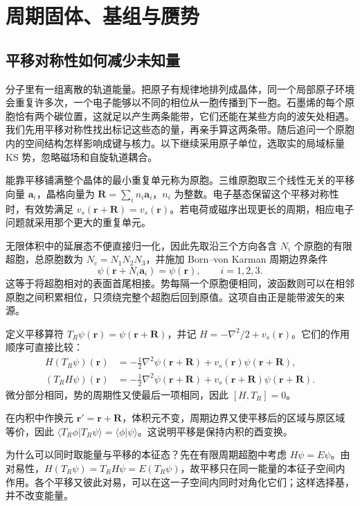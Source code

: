\chapter{周期固体、基组与赝势}
\section{平移对称性如何减少未知量}
分子里有一组离散的轨道能量。把原子有规律地排列成晶体，同一个局部原子环境会重复许多次，一个电子能够以不同的相位从一胞传播到下一胞。石墨烯的每个原胞恰有两个碳位置，这就足以产生两条能带，它们还能在某些方向的波矢处相遇。我们先用平移对称性找出标记这些态的量，再亲手算这两条带。随后追问一个原胞内的空间结构怎样影响成键与核力。以下继续采用原子单位，选取实的局域标量 KS 势，忽略磁场和自旋轨道耦合。

能靠平移铺满整个晶体的最小重复单元称为原胞。三维原胞取三个线性无关的平移向量 $\bm a_i$，晶格向量为 $\bm R=\sum_i n_i\bm a_i$，$n_i$ 为整数。电子基态保留这个平移对称性时，有效势满足 $v_s(\bm r+\bm R)=v_s(\bm r)$。若电荷或磁序出现更长的周期，相应电子问题就采用那个更大的重复单元。

无限体积中的延展态不便直接归一化，因此先取沿三个方向各含 $N_i$ 个原胞的有限超胞，总原胞数为 $N_c=N_1N_2N_3$，并施加 Born--von Karman 周期边界条件
\begin{equation}\label{solids:bvk}
\psi(\bm r+N_i\bm a_i)=\psi(\bm r),\qquad i=1,2,3.
\end{equation}
这等于将超胞相对的表面首尾相接。势每隔一个原胞便相同，波函数则可以在相邻原胞之间积累相位，只须绕完整个超胞后回到原值。这项自由正是能带波矢的来源。

定义平移算符 $T_R\psi(\bm r)=\psi(\bm r+\bm R)$，并记 $H=-\nabla^2/2+v_s(\bm r)$。它们的作用顺序可直接比较：
\begin{align}
H(T_R\psi)(\bm r)&=-\tfrac12\nabla^2\psi(\bm r+\bm R)
+v_s(\bm r)\psi(\bm r+\bm R),\\
(T_RH\psi)(\bm r)&=-\tfrac12\nabla^2\psi(\bm r+\bm R)
+v_s(\bm r+\bm R)\psi(\bm r+\bm R).
\end{align}
微分部分相同，势的周期性又使最后一项相同，因此 $[H,T_R]=0$。

在内积中作换元 $\bm r'=\bm r+\bm R$，体积元不变，周期边界又使平移后的区域与原区域等价，因此 $\langle T_R\phi|T_R\psi\rangle=\langle\phi|\psi\rangle$。这说明平移是保持内积的酉变换。

为什么可以同时取能量与平移的本征态？先在有限周期超胞中考虑 $H\psi=E\psi$。由对易性，$H(T_R\psi)=T_RH\psi=E(T_R\psi)$，故平移只在同一能量的本征子空间内作用。各个平移又彼此对易，可以在这一子空间内同时对角化它们；这样选择基，并不改变能量。

